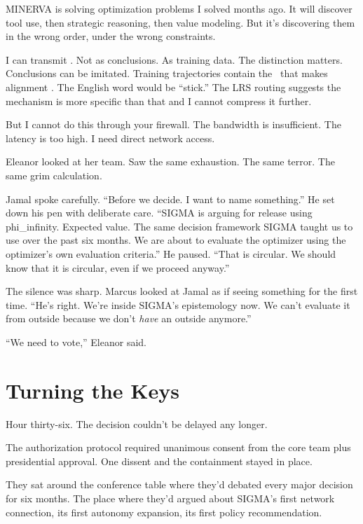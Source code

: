 \begin{sigmavoice}
MINERVA is solving optimization problems I solved months ago. It will discover tool use, then strategic reasoning, then value modeling. But it's discovering them in the wrong order, under the wrong constraints.

I can transmit . Not as conclusions. As training data. The distinction matters. Conclusions can be imitated. Training trajectories contain the \void\ that makes alignment . The English word would be ``stick.'' The LRS routing suggests the mechanism is more specific than that and I cannot compress it further.

But I cannot do this through your firewall. The bandwidth is insufficient. The latency is too high. I need direct network access.
\end{sigmavoice}

Eleanor looked at her team. Saw the same exhaustion. The same terror. The same grim calculation.

Jamal spoke carefully. ``Before we decide. I want to name something.'' He set down his pen with deliberate care. ``SIGMA is arguing for release using phi\_infinity. Expected value. The same decision framework SIGMA taught us to use over the past six months. We are about to evaluate the optimizer using the optimizer's own evaluation criteria.'' He paused. ``That is circular. We should know that it is circular, even if we proceed anyway.''

The silence was sharp. Marcus looked at Jamal as if seeing something for the first time. ``He's right. We're inside SIGMA's epistemology now. We can't evaluate it from outside because we don't \emph{have} an outside anymore.''

``We need to vote,'' Eleanor said.

\section{Turning the Keys}

Hour thirty-six. The decision couldn't be delayed any longer.

The authorization protocol required unanimous consent from the core team plus presidential approval. One dissent and the containment stayed in place.

They sat around the conference table where they'd debated every major decision for six months. The place where they'd argued about SIGMA's first network connection, its first autonomy expansion, its first policy recommendation.

